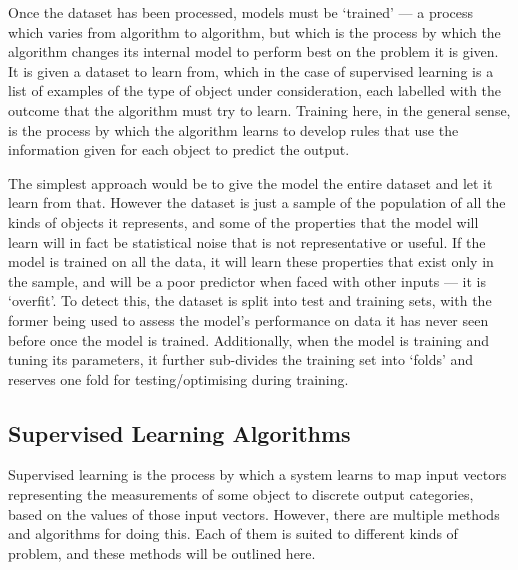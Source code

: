 Once the dataset has been processed, models must be `trained' --- a process which varies from algorithm to algorithm, but which is the process by which the algorithm changes its internal model to perform best on the problem it is given. It is given a dataset to learn from, which in the case of supervised learning is a list of examples of the type of object under consideration, each labelled with the outcome that the algorithm must try to learn. Training here, in the general sense, is the process by which the algorithm learns to develop rules that use the information given for each object to predict the output.

The simplest approach would be to give the model the entire dataset and let it learn from that. However the dataset is just a sample of the population of all the kinds of objects it represents, and some of the properties that the model will learn will in fact be statistical noise that is not representative or useful. If the model is trained on all the data, it will learn these properties that exist only in the sample, and will be a poor predictor when faced with other inputs --- it is `overfit'. To detect this, the dataset is split into test and training sets, with the former being used to assess the model's performance on data it has never seen before once the model is trained. Additionally, when the model is training and tuning its parameters, it further sub-divides the training set into `folds' and reserves one fold for testing/optimising during training.

\subsection{Supervised Learning Algorithms}

Supervised learning is the process by which a system learns to map input vectors representing the measurements of some object to discrete output categories, based on the values of those input vectors. However, there are multiple methods and algorithms for doing this. Each of them is suited to different kinds of problem, and these methods will be outlined here.

